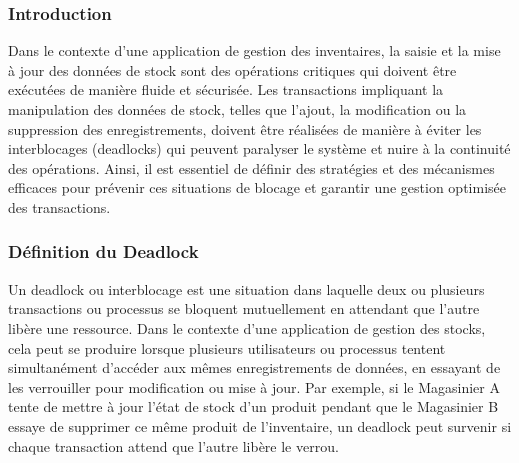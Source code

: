 \documentclass[a4paper, oneside, 12pt, final]{extreport}
\begin{document}
\subsubsection{Introduction}
Dans le contexte d'une application de gestion des inventaires, la saisie et la mise à jour des données de stock sont des opérations critiques qui doivent être exécutées de manière fluide et sécurisée. Les transactions impliquant la manipulation des données de stock, telles que l'ajout, la modification ou la suppression des enregistrements, doivent être réalisées de manière à éviter les interblocages (deadlocks) qui peuvent paralyser le système et nuire à la continuité des opérations. Ainsi, il est essentiel de définir des stratégies et des mécanismes efficaces pour prévenir ces situations de blocage et garantir une gestion optimisée des transactions.

\subsubsection{Définition du Deadlock}
Un deadlock ou interblocage est une situation dans laquelle deux ou plusieurs transactions ou processus se bloquent mutuellement en attendant que l'autre libère une ressource. Dans le contexte d'une application de gestion des stocks, cela peut se produire lorsque plusieurs utilisateurs ou processus tentent simultanément d'accéder aux mêmes enregistrements de données, en essayant de les verrouiller pour modification ou mise à jour. Par exemple, si le Magasinier A tente de mettre à jour l'état de stock d'un produit pendant que le Magasinier B essaye de supprimer ce même produit de l'inventaire, un deadlock peut survenir si chaque transaction attend que l'autre libère le verrou.
\end{document}
